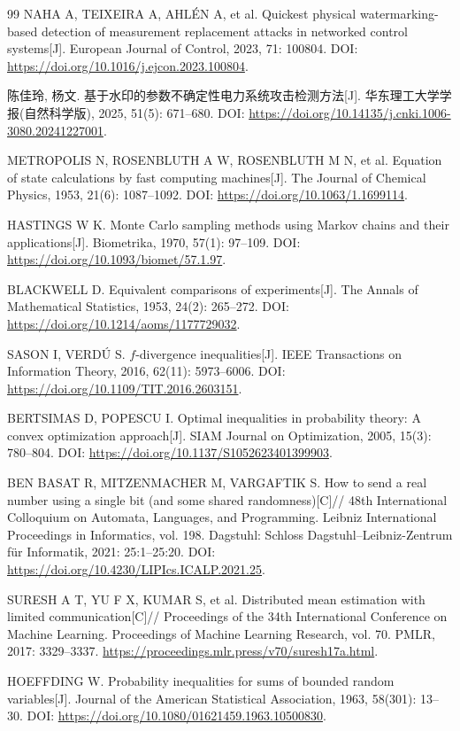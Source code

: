 \begin{thebibliography}{99}
NAHA A, TEIXEIRA A, AHL\'EN A, et al.
Quickest physical watermarking-based detection of measurement replacement attacks in networked control systems[J].
European Journal of Control, 2023, 71: 100804.
DOI: \url{https://doi.org/10.1016/j.ejcon.2023.100804}.

陈佳玲, 杨文.
基于水印的参数不确定性电力系统攻击检测方法[J].
华东理工大学学报(自然科学版), 2025, 51(5): 671--680.
DOI: \url{https://doi.org/10.14135/j.cnki.1006-3080.20241227001}.

METROPOLIS N, ROSENBLUTH A W, ROSENBLUTH M N, et al.
Equation of state calculations by fast computing machines[J].
The Journal of Chemical Physics, 1953, 21(6): 1087--1092.
DOI: \url{https://doi.org/10.1063/1.1699114}.

HASTINGS W K.
Monte Carlo sampling methods using Markov chains and their applications[J].
Biometrika, 1970, 57(1): 97--109.
DOI: \url{https://doi.org/10.1093/biomet/57.1.97}.

BLACKWELL D.
Equivalent comparisons of experiments[J].
The Annals of Mathematical Statistics, 1953, 24(2): 265--272.
DOI: \url{https://doi.org/10.1214/aoms/1177729032}.

SASON I, VERD\'U S.
$f$-divergence inequalities[J].
IEEE Transactions on Information Theory, 2016, 62(11): 5973--6006.
DOI: \url{https://doi.org/10.1109/TIT.2016.2603151}.

BERTSIMAS D, POPESCU I.
Optimal inequalities in probability theory: A convex optimization approach[J].
SIAM Journal on Optimization, 2005, 15(3): 780--804.
DOI: \url{https://doi.org/10.1137/S1052623401399903}.

BEN BASAT R, MITZENMACHER M, VARGAFTIK S.
How to send a real number using a single bit (and some shared randomness)[C]//
48th International Colloquium on Automata, Languages, and Programming.
Leibniz International Proceedings in Informatics, vol. 198.
Dagstuhl: Schloss Dagstuhl--Leibniz-Zentrum f\"ur Informatik, 2021: 25:1--25:20.
DOI: \url{https://doi.org/10.4230/LIPIcs.ICALP.2021.25}.

SURESH A T, YU F X, KUMAR S, et al.
Distributed mean estimation with limited communication[C]//
Proceedings of the 34th International Conference on Machine Learning.
Proceedings of Machine Learning Research, vol. 70.
PMLR, 2017: 3329--3337.
\url{https://proceedings.mlr.press/v70/suresh17a.html}.

HOEFFDING W.
Probability inequalities for sums of bounded random variables[J].
Journal of the American Statistical Association, 1963, 58(301): 13--30.
DOI: \url{https://doi.org/10.1080/01621459.1963.10500830}.

\end{thebibliography}
